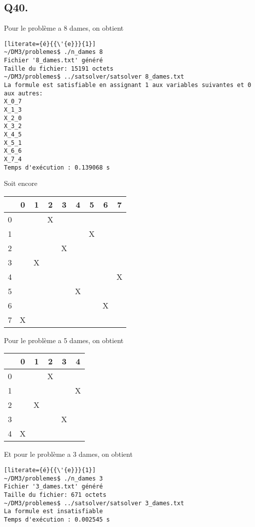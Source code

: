 	\subsection*{Q40.}
	Pour le problème a 8 dames, on obtient
	\begin{lstlisting}[literate={é}{{\'{e}}}{1}]
~/DM3/problemes$ ./n_dames 8
Fichier '8_dames.txt' généré
Taille du fichier: 15191 octets
~/DM3/problemes$ ../satsolver/satsolver 8_dames.txt 
La formule est satisfiable en assignant 1 aux variables suivantes et 0 aux autres:
X_0_7
X_1_3
X_2_0
X_3_2
X_4_5
X_5_1
X_6_6
X_7_4
Temps d'exécution : 0.139068 s
	\end{lstlisting}
	Soit encore
	\begin{center}
		\begin{tabular}{| c || *{8}{c |}}
		\hline
		  & 0 & 1 & 2 & 3 & 4 & 5 & 6 & 7 \\
		\hline
		\hline
		0 &   &   & X &   &   &   &   &   \\
		\hline
		1 &   &   &   &   &   & X &   &   \\
		\hline
		2 &   &   &   & X &   &   &   &   \\
		\hline
		3 &   & X &   &   &   &   &   &   \\
		\hline
		4 &   &   &   &   &   &   &   & X \\
		\hline
		5 &   &   &   &   & X &   &   &   \\
		\hline
		6 &   &   &   &   &   &   & X &   \\
		\hline
		7 & X &   &   &   &   &   &   &   \\
		\hline
		\end{tabular}
	\end{center}
	Pour le problème a 5 dames, on obtient
	\begin{center}
		\begin{tabular}{| c || *{5}{c |}}
		\hline
		  & 0 & 1 & 2 & 3 & 4 \\
		\hline
		\hline
		0 &   &   & X &   &   \\
		\hline
		1 &   &   &   &   & X \\
		\hline
		2 &   & X &   &   &   \\
		\hline
		3 &   &   &   & X &   \\
		\hline
		4 & X &   &   &   &   \\
		\hline
		\end{tabular}
	\end{center}
	Et pour le problème a 3 dames, on obtient
	\begin{lstlisting}[literate={é}{{\'{e}}}{1}]
~/DM3/problemes$ ./n_dames 3
Fichier '3_dames.txt' généré
Taille du fichier: 671 octets
~/DM3/problemes$ ../satsolver/satsolver 3_dames.txt 
La formule est insatisfiable
Temps d'exécution : 0.002545 s
	\end{lstlisting}

